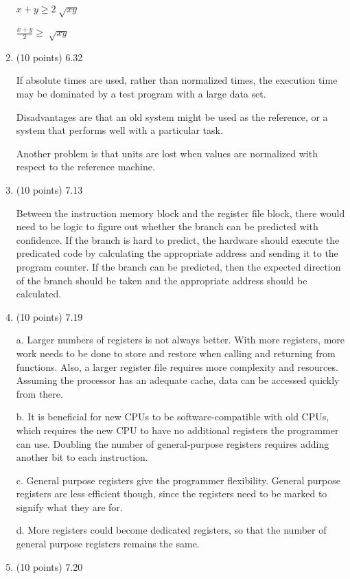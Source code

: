 \documentclass[letterpaper,10pt,onecolumn,titlepage]{article}
\begin{document}
\begin{enumerate}
  $x + y  \geq  2\sqrt[]{xy}$
  
  $\frac{x + y}{2}  \geq  \sqrt[]{xy}$

\item (10 points) 6.32

  If absolute times are used, rather than normalized times, the execution time may be dominated by a test program with a large data set.
  
  Disadvantages are that an old system might be used as the reference, or a system that performs well with a particular task.
  
  Another problem is that units are lost when values are normalized with respect to the reference machine.

\item (10 points) 7.13

  Between the instruction memory block and the register file block, there would need to be logic to figure out whether the branch can be predicted with confidence.
  If the branch is hard to predict, the hardware should execute the predicated code by calculating the appropriate address and sending it to the program counter.
  If the branch can be predicted, then the expected direction of the branch should be taken and the appropriate address should be calculated.

\item (10 points) 7.19

  a.  Larger numbers of registers is not always better.
  With more registers, more work needs to be done to store and restore when calling and returning from functions.
  Also, a larger register file requires more complexity and resources.
  Assuming the processor has an adequate cache, data can be accessed quickly from there.
  
  b.  It is beneficial for new CPUs to be software-compatible with old CPUs, which requires the new CPU to have no additional registers the programmer can use.
  Doubling the number of general-purpose registers requires adding another bit to each instruction.
  
  c.  General purpose registers give the programmer flexibility.
  General purpose registers are less efficient though, since the registers need to be marked to signify what they are for.
	  
  d.  More registers could become dedicated registers, so that the number of general purpose registers remains the same.

\item (10 points) 7.20


\end{enumerate}
\end{document}
